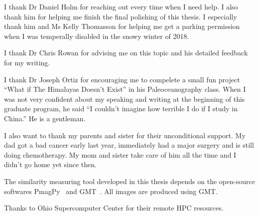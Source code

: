 \begin{acknowledgements}

I thank Dr Daniel Holm for reaching out every time when I need help. I also
  thank him for helping me finish the final polishing of this thesis. I
  especially thank him and Ms Kelly Thomasson for helping me get a parking
  permission when I was temperally disabled in the snowy winter of 2018.

I thank Dr Chris Rowan for advising me on this topic and his detailed feedback
  for my writing.

I thank Dr Joseph Ortiz for encouraging me to compelete a small fun project
  ``What if The Himalayas Doesn't Exist'' in his Paleoceanography class. When I
  was not very confident about my speaking and writing at the beginning of this
  graduate program, he said ``I couldn't imagine how terrible I do if I study in
  China.'' He is a gentleman.

I also want to thank my parents and sister for their unconditional support. My
  dad got a bad cancer early last year, immediately had a major surgery and is
  still doing chemotherapy. My mom and sister take care of him all the time and
  I didn't go home yet since then.

The similarity measuring tool developed in this thesis depends on the
  open-source softwares PmagPy~\citep{T16} and GMT~\citep{W13}. All images are
  produced using GMT\@.

Thanks to Ohio Supercomputer Center for their remote HPC resources.

\end{acknowledgements}
